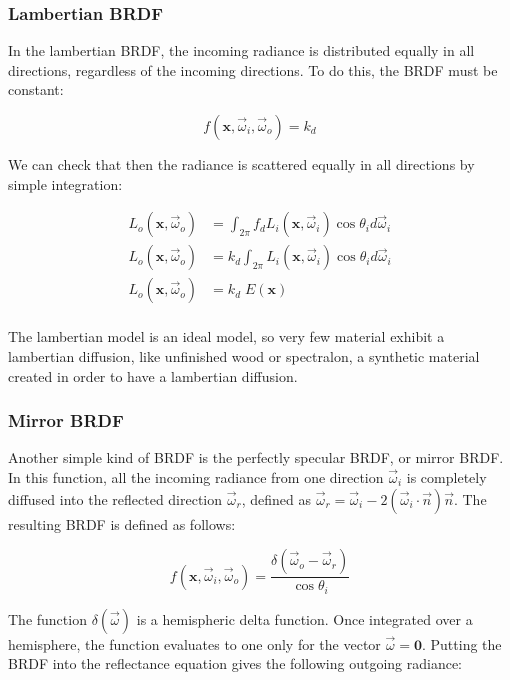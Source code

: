 \subsubsection{Lambertian BRDF}

In the lambertian BRDF, the incoming radiance is distributed equally in all directions, regardless of the incoming directions. To do this, the BRDF must be constant:

$$
f(\mathbf{x}, \vec{\omega}_i, \vec{\omega}_o) = k_d
$$

We can check that then the radiance is scattered equally in all directions by simple integration:

\begin{equation*}
\begin{split}
L_o(\mathbf{x}, \vec{\omega}_o) &= \int_{2\pi} f_d L_i(\mathbf{x}, \vec{\omega}_i) \cos\theta_i d\vec{\omega}_i \\
L_o(\mathbf{x}, \vec{\omega}_o) &= k_d \int_{2\pi} L_i(\mathbf{x}, \vec{\omega}_i) \cos\theta_i d\vec{\omega}_i \\
L_o(\mathbf{x}, \vec{\omega}_o) &= k_d \; E(\mathbf{x}) \\
\end{split}
\end{equation*}

The lambertian model is an ideal model, so very few material exhibit a lambertian diffusion, like unfinished wood or spectralon, a synthetic material created in order to have a lambertian diffusion. 

\subsubsection{Mirror BRDF}

Another simple kind of BRDF is the perfectly specular BRDF, or mirror BRDF. In this function, all the incoming radiance from one direction $\vec{\omega}_i$ is completely diffused into the reflected direction $\vec{\omega}_r$, defined as $\vec{\omega}_r = \vec{\omega}_i - 2 (\vec{\omega}_i \cdot \vec{n}) \vec{n}$. The resulting BRDF is defined as follows:

$$
f(\mathbf{x}, \vec{\omega}_i, \vec{\omega}_o) = \frac{\delta(\vec{\omega}_o - \vec{\omega}_r)}{\cos\theta_i} 
$$

The function $\delta(\vec{\omega})$ is a hemispheric delta function. Once integrated over a hemisphere, the function evaluates to one only for the vector $\vec{\omega} = \mathbf{0}$. Putting the BRDF into the reflectance equation gives the following outgoing radiance:

